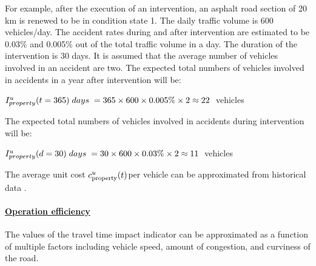 For example, after the execution of an intervention, an asphalt road section of 20 km is renewed to be in condition state 1. The daily traffic volume is 600 vehicles/day. The accident rates during and after intervention are estimated to be 0.03\% and 0.005\% out of the total traffic volume in a day. The duration of the intervention is 30 days. It is assumed that the average number of vehicles involved in an accident are two. 
%
The expected total numbers of vehicles involved in accidents in a year after intervention will be:

$I^u_{property}(t=365) \hspace{1mm}days \hspace{1mm} =365\times600\times0.005\%\times2 \approx 22 \hspace{1mm}$ vehicles 
%

The expected total numbers of vehicles involved in accidents during intervention will be:

$I^u_{property}(d=30) \hspace{1mm}days \hspace{1mm} =30\times600\times0.03\%\times2 \approx 11 \hspace{1mm}$ vehicles

The average unit cost $c_{{\rm{property}}}^u(t)$per vehicle can be approximated from historical data \cite{Lindberg1999}. 

\paragraph{\underline{Operation efficiency}}

The values of the travel time impact indicator can be approximated as a function of multiple factors including vehicle speed, amount of congestion, and curviness of the road. 

